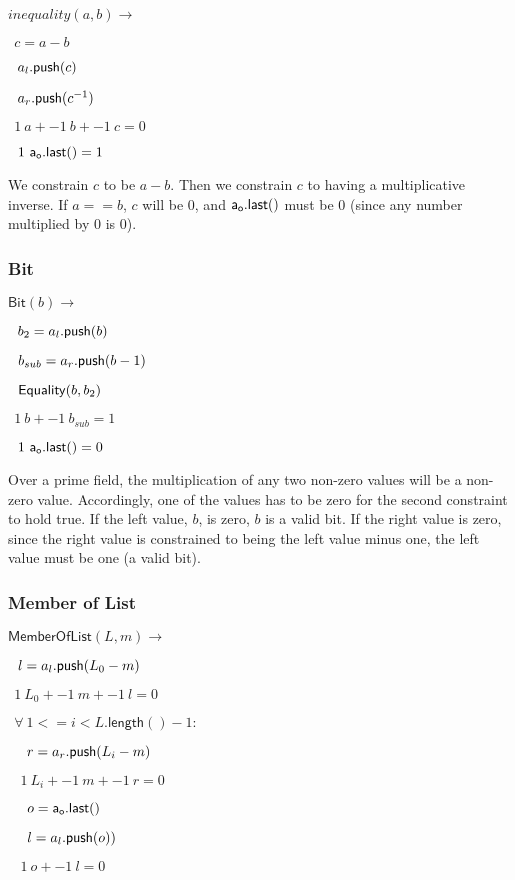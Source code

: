 \documentclass[]{article}
\begin{document}
$inequality(a, b) \rightarrow$

$~~c = a - b$

$~~a_l\mathsf{.push}(c)$

$~~a_r\mathsf{.push}(c^{-1})$

$~~1 ~a + -1 ~b + -1 ~c = 0$

$~~1 ~\mathsf{a_o.last()} = 1$

We constrain $c$ to be $a - b$. Then we constrain $c$ to having a multiplicative inverse. If $a == b$, $c$ will be $0$, and $\mathsf{a_o.last()}$ must be $0$ (since any number multiplied by $0$ is $0$).

\subsubsection{Bit}

\newcommand{\bit}{\mathsf{Bit}}

$\bit(b) \rightarrow$

$~~b_2 = a_l\mathsf{.push}(b)$

$~~b_{sub} = a_r\mathsf{.push}(b-1)$

$~~\mathsf{Equality}(b, b_2)$

$~~1 ~b + -1 ~b_{sub} = 1$

$~~1 ~\mathsf{a_o.last()} = 0$

Over a prime field, the multiplication of any two non-zero values will be a non-zero value. Accordingly, one of the values has to be zero for the second constraint to hold true. If the left value, $b$, is zero, $b$ is a valid bit. If the right value is zero, since the right value is constrained to being the left value minus one, the left value must be one (a valid bit).

\subsubsection{Member of List}

\newcommand{\memberlist}{\mathsf{MemberOfList}}

$\memberlist(L, m) \rightarrow$

$~~l = a_l\mathsf{.push}(L_0 - m)$

$~~1 ~L_0 + -1 ~m + -1 ~l = 0$

$~~\forall ~1 <= i < L\mathsf{.length}() - 1:$

$~~~~r = a_r\mathsf{.push}(L_i - m)$

$~~~~1 ~L_i + -1 ~m + -1 ~r = 0$

$~~~~o = \mathsf{a_o.last()}$

$~~~~l = a_l\mathsf{.push}(o))$

$~~~~1 ~o + -1 ~l = 0$
\end{document}
